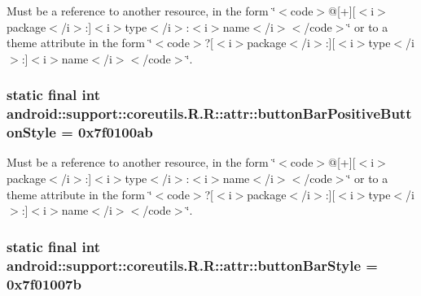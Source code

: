 Must be a reference to another resource, in the form \char`\"{}$<$code$>$@\mbox{[}+\mbox{]}\mbox{[}$<$i$>$package$<$/i$>$:\mbox{]}$<$i$>$type$<$/i$>$:$<$i$>$name$<$/i$>$$<$/code$>$\char`\"{} or to a theme attribute in the form \char`\"{}$<$code$>$?\mbox{[}$<$i$>$package$<$/i$>$:\mbox{]}\mbox{[}$<$i$>$type$<$/i$>$:\mbox{]}$<$i$>$name$<$/i$>$$<$/code$>$\char`\"{}. \hypertarget{classandroid_1_1support_1_1coreutils_1_1_r_1_1attr_d52b5f5a49ed8892145ce2ad7b74a78c}{
\subsubsection[{buttonBarPositiveButtonStyle}]{\setlength{\rightskip}{0pt plus 5cm}static final int android::support::coreutils.R.R::attr::buttonBarPositiveButtonStyle = 0x7f0100ab}}
\label{classandroid_1_1support_1_1coreutils_1_1_r_1_1attr_d52b5f5a49ed8892145ce2ad7b74a78c}


Must be a reference to another resource, in the form \char`\"{}$<$code$>$@\mbox{[}+\mbox{]}\mbox{[}$<$i$>$package$<$/i$>$:\mbox{]}$<$i$>$type$<$/i$>$:$<$i$>$name$<$/i$>$$<$/code$>$\char`\"{} or to a theme attribute in the form \char`\"{}$<$code$>$?\mbox{[}$<$i$>$package$<$/i$>$:\mbox{]}\mbox{[}$<$i$>$type$<$/i$>$:\mbox{]}$<$i$>$name$<$/i$>$$<$/code$>$\char`\"{}. \hypertarget{classandroid_1_1support_1_1coreutils_1_1_r_1_1attr_1ace7ce2e4446e8bccbbf2d9776b5df8}{
\subsubsection[{buttonBarStyle}]{\setlength{\rightskip}{0pt plus 5cm}static final int android::support::coreutils.R.R::attr::buttonBarStyle = 0x7f01007b}}
\label{classandroid_1_1support_1_1coreutils_1_1_r_1_1attr_1ace7ce2e4446e8bccbbf2d9776b5df8}


